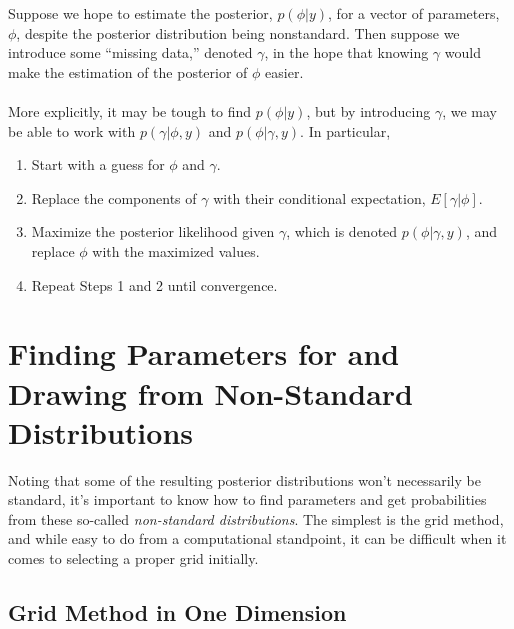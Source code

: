 \documentclass[a4paper,12pt]{scrartcl}
\begin{document}
Suppose we hope to estimate the posterior, $p(\phi|y)$, for
a vector of parameters, $\phi$,
despite the posterior distribution being nonstandard. Then suppose
we introduce some ``missing data,'' denoted $\gamma$, in the hope that
knowing $\gamma$ would make the estimation of the posterior of
$\phi$ easier. 
\\
\\
More explicitly, it may be tough to find $p(\phi|y)$, but by introducing
$\gamma$, we may be able to work with $p(\gamma|\phi,y)$ and 
$p(\phi|\gamma,y)$. In particular, 
\begin{enumerate}
   \item Start with a guess for $\phi$ and $\gamma$.
   \item Replace the components of $\gamma$ with
      their conditional expectation, $E[\gamma | \phi]$.
   \item Maximize the posterior
      likelihood given $\gamma$, which is denoted $p(\phi|\gamma,y)$,
      and replace $\phi$ with the maximized values.
   \item Repeat Steps 1 and 2 until convergence. 
\end{enumerate}




\newpage


\appendix

\newpage
\section{Finding Parameters for and 
Drawing from Non-Standard Distributions}

Noting that some of the resulting posterior distributions won't 
necessarily be standard, it's important to know how to find parameters
and get probabilities
from these so-called \emph{non-standard distributions}. The simplest
is the grid method, and while easy to do from a computational 
standpoint,
it can be difficult when it comes to selecting a proper grid
initially.

\subsection{Grid Method in One Dimension}
\end{document}
